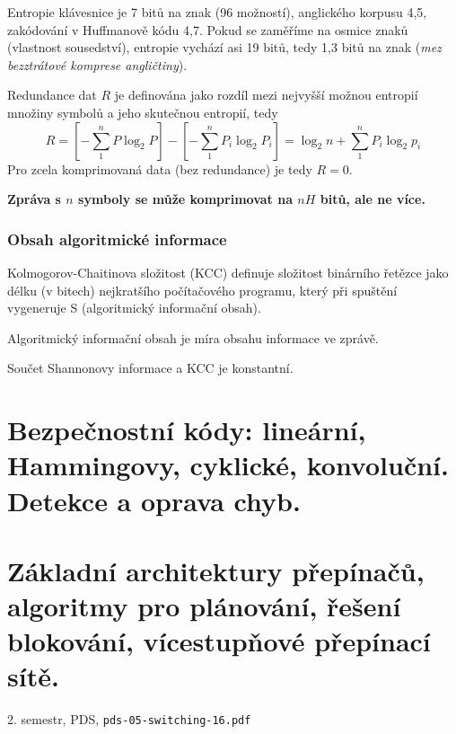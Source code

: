 \documentclass[a4paper, 11pt]{report}
\begin{document}
Entropie klávesnice je 7 bitů na znak (96 možností), anglického korpusu 4,5, zakódování v Huffmanově kódu 4,7. Pokud se zaměříme na osmice znaků (vlastnost sousedství), entropie vychází asi 19 bitů, tedy 1,3  bitů na znak (\emph{mez bezztrátové komprese angličtiny}).

Redundance dat $R$ je definována jako rozdíl mezi nejvyšší možnou entropií množiny symbolů a jeho skutečnou entropií, tedy
$$R = \left[ - \sum\limits_1^n P \log_2 P \right] - \left[ - \sum\limits_1^n P_i \log_2 P_i \right] = \log_2 n + \sum\limits_1^n P_i \log_2 p_i $$
Pro zcela komprimovaná data (bez redundance) je tedy $R=0$.

\textbf{Zpráva s $n$ symboly se může komprimovat na $nH$ bitů, ale ne více.}

\subsection{Obsah algoritmické informace}

Kolmogorov-Chaitinova složitost (KCC) definuje složitost binárního řetězce jako délku (v bitech) nejkratšího počítačového programu, který při spuštění vygeneruje S (algoritmický informační obsah).

Algoritmický informační obsah je míra obsahu informace ve zprávě.

Součet Shannonovy informace a KCC je konstantní.

\chapter{Bezpečnostní kódy: lineární, Hammingovy, cyklické, konvoluční. Detekce a oprava chyb.} \label{cha:38}

\chapter{Základní architektury přepínačů, algoritmy pro plánování, řešení blokování, vícestupňové přepínací sítě.} \label{cha:39}
2. semestr, PDS, \texttt{pds-05-switching-16.pdf}
\end{document}
